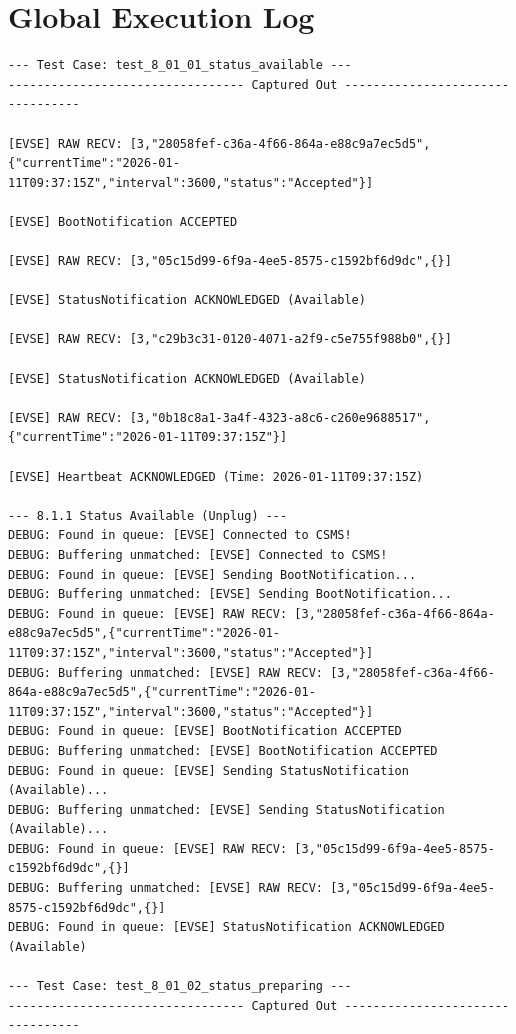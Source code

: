 \documentclass{article}
\begin{document}
\section{Global Execution Log}
\begin{lstlisting}
--- Test Case: test_8_01_01_status_available ---
--------------------------------- Captured Out ---------------------------------

[EVSE] RAW RECV: [3,"28058fef-c36a-4f66-864a-e88c9a7ec5d5",{"currentTime":"2026-01-11T09:37:15Z","interval":3600,"status":"Accepted"}]

[EVSE] BootNotification ACCEPTED

[EVSE] RAW RECV: [3,"05c15d99-6f9a-4ee5-8575-c1592bf6d9dc",{}]

[EVSE] StatusNotification ACKNOWLEDGED (Available)

[EVSE] RAW RECV: [3,"c29b3c31-0120-4071-a2f9-c5e755f988b0",{}]

[EVSE] StatusNotification ACKNOWLEDGED (Available)

[EVSE] RAW RECV: [3,"0b18c8a1-3a4f-4323-a8c6-c260e9688517",{"currentTime":"2026-01-11T09:37:15Z"}]

[EVSE] Heartbeat ACKNOWLEDGED (Time: 2026-01-11T09:37:15Z)

--- 8.1.1 Status Available (Unplug) ---
DEBUG: Found in queue: [EVSE] Connected to CSMS!
DEBUG: Buffering unmatched: [EVSE] Connected to CSMS!
DEBUG: Found in queue: [EVSE] Sending BootNotification...
DEBUG: Buffering unmatched: [EVSE] Sending BootNotification...
DEBUG: Found in queue: [EVSE] RAW RECV: [3,"28058fef-c36a-4f66-864a-e88c9a7ec5d5",{"currentTime":"2026-01-11T09:37:15Z","interval":3600,"status":"Accepted"}]
DEBUG: Buffering unmatched: [EVSE] RAW RECV: [3,"28058fef-c36a-4f66-864a-e88c9a7ec5d5",{"currentTime":"2026-01-11T09:37:15Z","interval":3600,"status":"Accepted"}]
DEBUG: Found in queue: [EVSE] BootNotification ACCEPTED
DEBUG: Buffering unmatched: [EVSE] BootNotification ACCEPTED
DEBUG: Found in queue: [EVSE] Sending StatusNotification (Available)...
DEBUG: Buffering unmatched: [EVSE] Sending StatusNotification (Available)...
DEBUG: Found in queue: [EVSE] RAW RECV: [3,"05c15d99-6f9a-4ee5-8575-c1592bf6d9dc",{}]
DEBUG: Buffering unmatched: [EVSE] RAW RECV: [3,"05c15d99-6f9a-4ee5-8575-c1592bf6d9dc",{}]
DEBUG: Found in queue: [EVSE] StatusNotification ACKNOWLEDGED (Available)

--- Test Case: test_8_01_02_status_preparing ---
--------------------------------- Captured Out ---------------------------------


\end{lstlisting}
\end{document}
